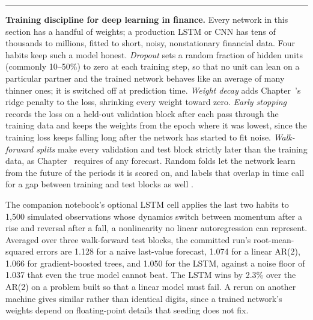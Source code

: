 \documentclass[../ai_in_finance]{subfiles}
\begin{document}
\medskip
\noindent\rule{\linewidth}{0.6pt}\par\nopagebreak
\noindent\textbf{Training discipline for deep learning in finance.} Every network in this section has a handful of weights; a production LSTM or CNN has tens of thousands to millions, fitted to short, noisy, nonstationary financial data. Four habits keep such a model honest. \emph{Dropout} sets a random fraction of hidden units (commonly 10--50\%) to zero at each training step, so that no unit can lean on a particular partner and the trained network behaves like an average of many thinner ones; it is switched off at prediction time. \emph{Weight decay} adds Chapter~'s ridge penalty to the loss, shrinking every weight toward zero. \emph{Early stopping} records the loss on a held-out validation block after each pass through the training data and keeps the weights from the epoch where it was lowest, since the training loss keeps falling long after the network has started to fit noise. \emph{Walk-forward splits} make every validation and test block strictly later than the training data, as Chapter~ requires of any forecast. Random folds let the network learn from the future of the periods it is scored on, and labels that overlap in time call for a gap between training and test blocks as well \parencite{lopezdeprado2018advances}.

The companion notebook's optional LSTM cell applies the last two habits to 1,500 simulated observations whose dynamics switch between momentum after a rise and reversal after a fall, a nonlinearity no linear autoregression can represent. Averaged over three walk-forward test blocks, the committed run's root-mean-squared errors are 1.128 for a naive last-value forecast, 1.074 for a linear AR(2), 1.066 for gradient-boosted trees, and 1.050 for the LSTM, against a noise floor of 1.037 that even the true model cannot beat. The LSTM wins by 2.3\% over the AR(2) on a problem built so that a linear model must fail. A rerun on another machine gives similar rather than identical digits, since a trained network's weights depend on floating-point details that seeding does not fix.
\end{document}
